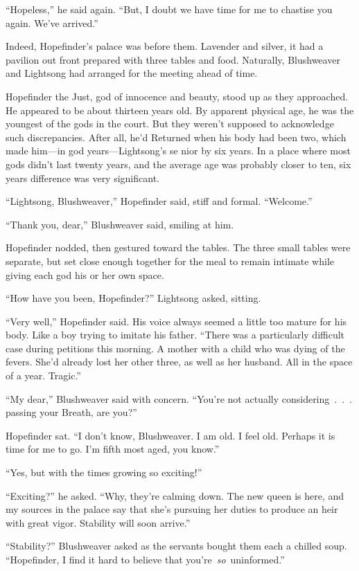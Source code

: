 “Hopeless,” he said again. “But, I doubt we have time for me to chastise you again. We’ve arrived.”

Indeed, Hopefinder’s palace was before them. Lavender and silver, it had a pavilion out front prepared with three tables and food. Naturally, Blushweaver and Lightsong had arranged for the meeting ahead of time.

Hopefinder the Just, god of innocence and beauty, stood up as they approached. He appeared to be about thirteen years old. By apparent physical age, he was the youngest of the gods in the court. But they weren’t supposed to acknowledge such discrepancies. After all, he’d Returned when his body had been two, which made him—in god years—Lightsong’s se nior by six years. In a place where most gods didn’t last twenty years, and the average age was probably closer to ten, six years difference was very significant.

“Lightsong, Blushweaver,” Hopefinder said, stiff and formal. “Welcome.”

“Thank you, dear,” Blushweaver said, smiling at him.

Hopefinder nodded, then gestured toward the tables. The three small tables were separate, but set close enough together for the meal to remain intimate while giving each god his or her own space.

“How have you been, Hopefinder?” Lightsong asked, sitting.

“Very well,” Hopefinder said. His voice always seemed a little too mature for his body. Like a boy trying to imitate his father. “There was a particularly difficult case during petitions this morning. A mother with a child who was dying of the fevers. She’d already lost her other three, as well as her husband. All in the space of a year. Tragic.”

“My dear,” Blushweaver said with concern. “You’re not actually considering~.~.~. passing your Breath, are you?”

Hopefinder sat. “I don’t know, Blushweaver. I am old. I feel old. Perhaps it is time for me to go. I’m fifth most aged, you know.”

“Yes, but with the times growing so exciting!”

“Exciting?” he asked. “Why, they’re calming down. The new queen is here, and my sources in the palace say that she’s pursuing her duties to produce an heir with great vigor. Stability will soon arrive.”

“Stability?” Blushweaver asked as the servants bought them each a chilled soup. “Hopefinder, I find it hard to believe that you’re~\textit{so}~uninformed.”

